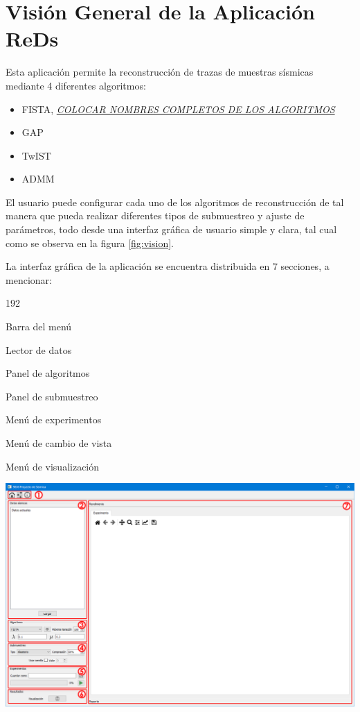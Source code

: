 \documentclass[12pt,oneside,letter]{ol-softwaremanual}
\newenvironment{Figure}
  {\par\medskip\noindent\minipage{\linewidth}}
  {\endminipage\par\medskip}
\begin{document}
\clearpage
\tableofcontents

\clearpage

\section{Visión General de la Aplicación ReDs}

Esta aplicación permite la reconstrucción de trazas de muestras sísmicas mediante 4 diferentes algoritmos:
\begin{itemize}[leftmargin=0.5in]
	\setlength\itemsep{0em}
	\item FISTA, \underline{\textit{COLOCAR NOMBRES COMPLETOS DE LOS ALGORITMOS}}
	\item GAP
	\item TwIST
	\item ADMM
\end{itemize}
El usuario puede configurar cada uno de los algoritmos de reconstrucción de tal manera que pueda realizar diferentes tipos de submuestreo y ajuste de parámetros, todo desde una interfaz gráfica de usuario simple y clara, tal cual como se observa en la figura \ref{fig:vision}.

La interfaz gráfica de la aplicación se encuentra distribuida en 7 secciones, a mencionar: 
\begin{dingautolist}{192}
	\setlength\itemsep{0em}
	\item Barra del menú
	\item Lector de datos
	\item Panel de algoritmos
	\item Panel de submuestreo
	\item Menú de experimentos
	\item Menú de cambio de vista
	\item Menú de visualización
\end{dingautolist}

\begin{Figure}
    \centering
    \includegraphics[width=1\linewidth]{main.png}
    \label{fig:vision}
\end{Figure}
\end{document}
